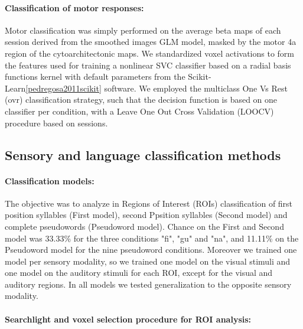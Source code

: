 \paragraph{Classification of motor responses:}
Motor classification was simply performed on the average beta maps of each session derived from the smoothed images GLM model, masked by the motor 4a region of the cytoarchitectonic maps.
We standardized voxel activations to form the features used for training a nonlinear SVC classifier based on a radial basis functions kernel with default parameters from the Scikit-Learn\ref{pedregosa2011scikit} software.
We employed the multiclass One Vs Rest (ovr) classification strategy, such that the decision function is based on one classifier per condition, with a Leave One Out Cross Validation (LOOCV) procedure based on sessions.

\subsection{Sensory and language classification methods}

\paragraph{Classification models:}
The objective was to analyze in Regions of Interest (ROIs) classification of first position syllables (First model), second Ppsition syllables (Second model) and complete pseudowords (Pseudoword model).
Chance on the First and Second model was 33.33\% for the three conditions "fi", "gu" and "na", and 11.11\% on the Pseudoword model for the nine pseudoword conditions.
Moreover we trained one model per sensory modality, so we trained one model on the visual stimuli and one model on the auditory stimuli for each ROI, except for the visual and auditory regions.
In all models we tested generalization to the opposite sensory modality.


\paragraph{Searchlight and voxel selection procedure for ROI analysis:}


